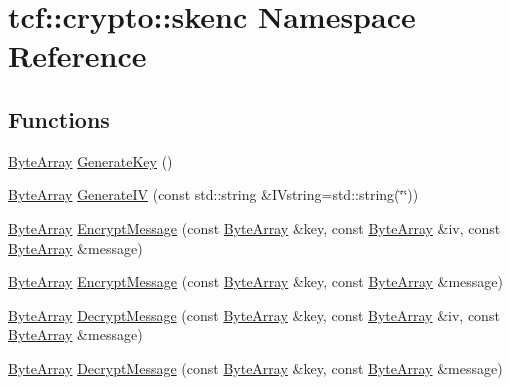 \hypertarget{namespacetcf_1_1crypto_1_1skenc}{}\section{tcf\+:\+:crypto\+:\+:skenc Namespace Reference}
\label{namespacetcf_1_1crypto_1_1skenc}
\subsection*{Functions}
\begin{DoxyCompactItemize}
\item 
\hyperlink{types_8h_a35da937e2331acce98d47f44892f4a76}{Byte\+Array} \hyperlink{namespacetcf_1_1crypto_1_1skenc_a3ef58796a0884661acd1b4655a9ca431}{Generate\+Key} ()
\item 
\hyperlink{types_8h_a35da937e2331acce98d47f44892f4a76}{Byte\+Array} \hyperlink{namespacetcf_1_1crypto_1_1skenc_a1e0203bf47c30fa78db18d32e7b8ec64}{Generate\+IV} (const std\+::string \&I\+Vstring=std\+::string(\char`\"{}\char`\"{}))
\item 
\hyperlink{types_8h_a35da937e2331acce98d47f44892f4a76}{Byte\+Array} \hyperlink{namespacetcf_1_1crypto_1_1skenc_a12c94c127224bfa602b80205ff93bae6}{Encrypt\+Message} (const \hyperlink{types_8h_a35da937e2331acce98d47f44892f4a76}{Byte\+Array} \&key, const \hyperlink{types_8h_a35da937e2331acce98d47f44892f4a76}{Byte\+Array} \&iv, const \hyperlink{types_8h_a35da937e2331acce98d47f44892f4a76}{Byte\+Array} \&message)
\item 
\hyperlink{types_8h_a35da937e2331acce98d47f44892f4a76}{Byte\+Array} \hyperlink{namespacetcf_1_1crypto_1_1skenc_a1672f183497e16c33daf8453eb2b5b4a}{Encrypt\+Message} (const \hyperlink{types_8h_a35da937e2331acce98d47f44892f4a76}{Byte\+Array} \&key, const \hyperlink{types_8h_a35da937e2331acce98d47f44892f4a76}{Byte\+Array} \&message)
\item 
\hyperlink{types_8h_a35da937e2331acce98d47f44892f4a76}{Byte\+Array} \hyperlink{namespacetcf_1_1crypto_1_1skenc_a8720d05eba1eda7246905c6a68f0996c}{Decrypt\+Message} (const \hyperlink{types_8h_a35da937e2331acce98d47f44892f4a76}{Byte\+Array} \&key, const \hyperlink{types_8h_a35da937e2331acce98d47f44892f4a76}{Byte\+Array} \&iv, const \hyperlink{types_8h_a35da937e2331acce98d47f44892f4a76}{Byte\+Array} \&message)
\item 
\hyperlink{types_8h_a35da937e2331acce98d47f44892f4a76}{Byte\+Array} \hyperlink{namespacetcf_1_1crypto_1_1skenc_a6a9b2c3b9b5d1f2d140bcac790132739}{Decrypt\+Message} (const \hyperlink{types_8h_a35da937e2331acce98d47f44892f4a76}{Byte\+Array} \&key, const \hyperlink{types_8h_a35da937e2331acce98d47f44892f4a76}{Byte\+Array} \&message)
\end{DoxyCompactItemize}


